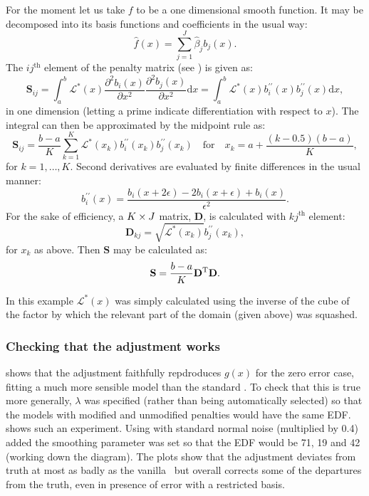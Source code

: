 For the moment let us take $f$ to be a one dimensional smooth function. It may be decomposed into its basis functions and coefficients in the usual way:
\begin{equation*}
\hat{f}(x)=\sum_{j=1}^J \hat{\beta}_j b_j(x).
\end{equation*}
The $ij^\text{th}$ element of the penalty matrix (see ) is given as:
\begin{equation*}
\mathbf{S}_{ij}= \int_a^b \mathcal{L}^*(x) \frac{\partial^2 b_i(x)}{\partial x^2}\frac{\partial^2 b_j(x)}{\partial x^2} \text{d}x = \int_a^b \mathcal{L}^*(x) b^{\prime\prime}_i(x) b^{\prime\prime}_j(x) \text{d}x,
\end{equation*}
in one dimension (letting a prime indicate differentiation with respect to $x$). The integral can then be approximated by the midpoint rule as:
\begin{equation}
\mathbf{S}_{ij}= \frac{b-a}{K}\sum_{k=1}^K \mathcal{L}^*(x_k) b^{\prime\prime}_i(x_k) b^{\prime\prime}_j(x_k) \quad \text{for} \quad x_k=a+\frac{(k-0.5)(b-a)}{K},
\label{midpointS}
\end{equation}
for $k=1,\dots, K$. Second derivatives are evaluated by finite differences in the usual manner:
\begin{equation}
\label{bfinitediff}
b^{\prime\prime}_i(x) = \frac{ b_i(x+2\epsilon) - 2b_i(x+\epsilon) + b_i(x)}{\epsilon^2}.
\end{equation}
For the sake of efficiency, a $K\times J$ matrix, $\mathbf{D}$, is calculated with $kj^\text{th}$ element:
\begin{equation}
\mathbf{D}_{kj}=\sqrt{\mathcal{L}^*(x_k)} b^{\prime\prime}_j(x_k),
\label{oneDD}
\end{equation}
for $x_k$ as above. Then $\mathbf{S}$ may be calculated as:
\begin{equation*}
\mathbf{S}=\frac{b-a}{K}\mathbf{D}^{\text{T}}\mathbf{D}.
\end{equation*}

In this example $\mathcal{L}^*(x)$ was simply calculated using the inverse of the cube of the factor by which the relevant part of the domain (given above) was squashed. 

\subsubsection{Checking that the adjustment works}

 shows that the adjustment faithfully repdroduces $g(x)$ for the zero error case, fitting a much more sensible model than the standard \tprs. To check that this is true more generally, $\lambda$ was specified (rather than being automatically selected) so that the models with modified and unmodified penalties would have the same EDF.  shows such an experiment. Using  with standard normal noise (multiplied by 0.4) added the smoothing parameter was set so that the EDF would be 71, 19 and 42 (working down the diagram). The plots show that the adjustment deviates from truth at most as badly as the vanilla \tprs\ but overall corrects some of the departures from the truth, even in presence of error with a restricted basis.

